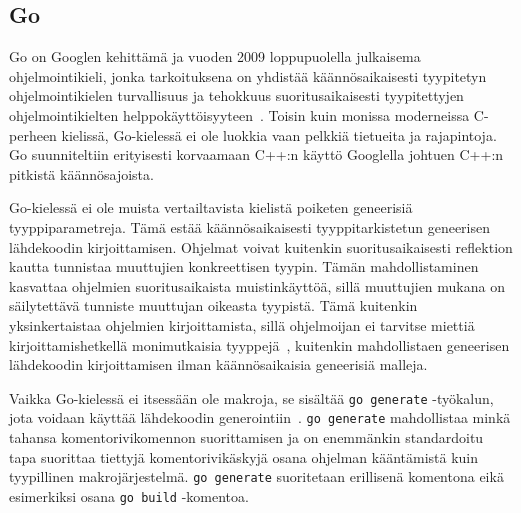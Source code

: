 \subsection{Go}
\label{sec:go}

Go on Googlen kehittämä ja vuoden 2009 loppupuolella julkaisema
ohjelmointikieli, jonka tarkoituksena on yhdistää käännösaikaisesti tyypitetyn
ohjelmointikielen turvallisuus ja tehokkuus suoritusaikaisesti tyypitettyjen
ohjelmointikielten helppokäyttöisyyteen~\citep{gohistory}. Toisin kuin monissa
moderneissa C-perheen kielissä, Go-kielessä ei ole luokkia vaan pelkkiä
tietueita ja rajapintoja. Go suunniteltiin erityisesti korvaamaan C++:n käyttö
Googlella johtuen C++:n pitkistä käännösajoista.

Go-kielessä ei ole muista vertailtavista kielistä poiketen geneerisiä
tyyppiparametreja. Tämä estää käännösaikaisesti tyyppitarkistetun geneerisen
lähdekoodin kirjoittamisen. Ohjelmat voivat kuitenkin suoritusaikaisesti
reflektion kautta tunnistaa muuttujien konkreettisen tyypin. Tämän
mahdollistaminen kasvattaa ohjelmien suoritusaikaista muistinkäyttöä, sillä
muuttujien mukana on säilytettävä tunniste muuttujan oikeasta tyypistä. Tämä
kuitenkin yksinkertaistaa ohjelmien kirjoittamista, sillä ohjelmoijan ei
tarvitse miettiä kirjoittamishetkellä monimutkaisia
tyyppejä~\citep[esim.][kalvo 8]{gohistory}, kuitenkin mahdollistaen geneerisen
lähdekoodin kirjoittamisen ilman käännösaikaisia geneerisiä malleja.


Vaikka Go-kielessä ei itsessään ole makroja, se sisältää \texttt{go~generate}
-työkalun, jota voidaan käyttää lähdekoodin generointiin~\citep{gogenerate}.
\texttt{go~generate} mahdollistaa minkä tahansa komentorivikomennon suorittamisen
ja on enemmänkin standardoitu tapa suorittaa tiettyjä komentorivikäskyjä osana
ohjelman kääntämistä kuin tyypillinen makrojärjestelmä.
\texttt{\mbox{go~generate}} suoritetaan erillisenä komentona eikä esimerkiksi osana
\texttt{\mbox{go~build}} -komentoa.




